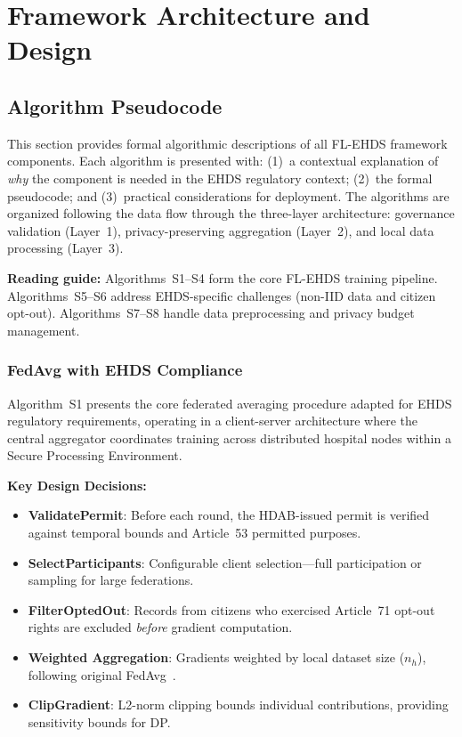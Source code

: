 \documentclass[conference]{IEEEtran}
\begin{document}
\section{Framework Architecture and Design}
\label{app:architecture}

\subsection{Algorithm Pseudocode}
\label{sec:pseudocode}

This section provides formal algorithmic descriptions of all FL-EHDS framework components. Each algorithm is presented with: (1)~a contextual explanation of \textit{why} the component is needed in the EHDS regulatory context; (2)~the formal pseudocode; and (3)~practical considerations for deployment. The algorithms are organized following the data flow through the three-layer architecture: governance validation (Layer~1), privacy-preserving aggregation (Layer~2), and local data processing (Layer~3).

\noindent\textbf{Reading guide:} Algorithms~S1--S4 form the core FL-EHDS training pipeline. Algorithms~S5--S6 address EHDS-specific challenges (non-IID data and citizen opt-out). Algorithms~S7--S8 handle data preprocessing and privacy budget management.

\subsubsection{FedAvg with EHDS Compliance}

Algorithm~S1 presents the core federated averaging procedure adapted for EHDS regulatory requirements, operating in a client-server architecture where the central aggregator coordinates training across distributed hospital nodes within a Secure Processing Environment.

\textbf{Key Design Decisions:}
\begin{itemize}
    \item \textbf{ValidatePermit}: Before each round, the HDAB-issued permit is verified against temporal bounds and Article~53 permitted purposes.
    \item \textbf{SelectParticipants}: Configurable client selection---full participation or sampling for large federations.
    \item \textbf{FilterOptedOut}: Records from citizens who exercised Article~71 opt-out rights are excluded \textit{before} gradient computation.
    \item \textbf{Weighted Aggregation}: Gradients weighted by local dataset size ($n_h$), following original FedAvg~\cite{mcmahan2017communication}.
    \item \textbf{ClipGradient}: L2-norm clipping bounds individual contributions, providing sensitivity bounds for DP.
\end{itemize}
\end{document}
